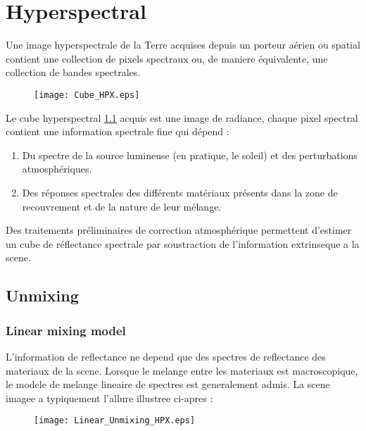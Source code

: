\chapter{Hyperspectral}

Une image hyperspectrale de la Terre acquises depuis
un porteur aérien ou spatial contient une collection de pixels
spectraux ou, de maniere équivalente, une collection de bandes
spectrales.

\begin{figure}[h]
  \centering
  \texttt{[image: Cube\_HPX.eps]}
  \label{fig:cube}
\end{figure}

Le cube hyperspectral \ref{fig:cube} acquis est une image de
radiance, chaque pixel spectral contient une information spectrale
fine qui dépend : 

\begin{enumerate}
\item{Du spectre de la source lumineuse (en pratique, le
soleil) et des perturbations atmosphériques.}
\item{Des réponses spectrales
des différents matériaux présents dans la zone de recouvrement et de la nature de leur mélange.}
\end{enumerate}

Des traitements préliminaires de
correction atmosphérique permettent d'estimer un cube de réflectance
spectrale par soustraction de l'information extrinseque a la
scene. 

\section{Unmixing}

\subsection{Linear mixing model}

L'information de reflectance ne depend que des spectres de
reflectance des materiaux de la scene. Lorsque le melange entre les
materiaux est macroscopique, le modele de melange lineaire de spectres
est generalement admis. La scene imagee a typiquement l'allure
illustree ci-apres :

\begin{figure}[h]
  \centering
  \texttt{[image: Linear\_Unmixing\_HPX.eps]}
  \label{fig:linear_unmixing}
\end{figure}

